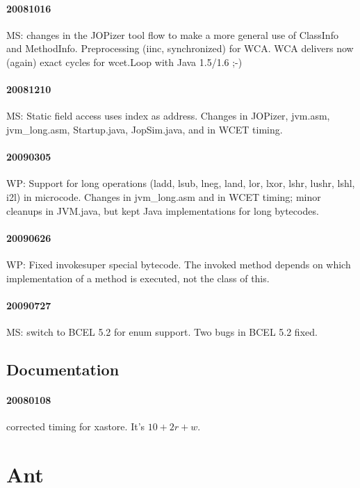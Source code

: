 \documentclass[a4paper,12pt]{scrartcl}
\newcommand{\code}[1]{{\textsf{#1}}}
\begin{document}
\paragraph{20081016} MS: changes in the JOPizer tool flow to make a
more general use of \code{ClassInfo} and \code{MethodInfo}.
Preprocessing (iinc, synchronized) for WCA. WCA delivers now (again)
exact cycles for \code{wcet.Loop} with Java 1.5/1.6 ;-)

\paragraph{20081210} MS: Static field access uses index as address.
Changes in \code{JOPizer}, \code{jvm.asm}, \code{jvm\_long.asm},
\code{Startup.java}, \code{JopSim.java}, and in WCET timing.

\paragraph{20090305} WP: Support for long operations (ladd, lsub,
lneg, land, lor, lxor, lshr, lushr, lshl, i2l) in microcode. Changes
in \code{jvm\_long.asm} and in WCET timing; minor cleanups in
JVM.java, but kept Java implementations for long bytecodes.

\paragraph{20090626} WP: Fixed invokesuper special bytecode. The
invoked method depends on which implementation of a method is
executed, not the class of \code{this}.

\paragraph{20090727} MS: switch to BCEL 5.2 for enum support. Two
bugs in BCEL 5.2 fixed.

\subsection{Documentation}

\paragraph{20080108} corrected timing for \code{xastore}. It's $10 +
2r + w$.

\section{Ant}
\end{document}
